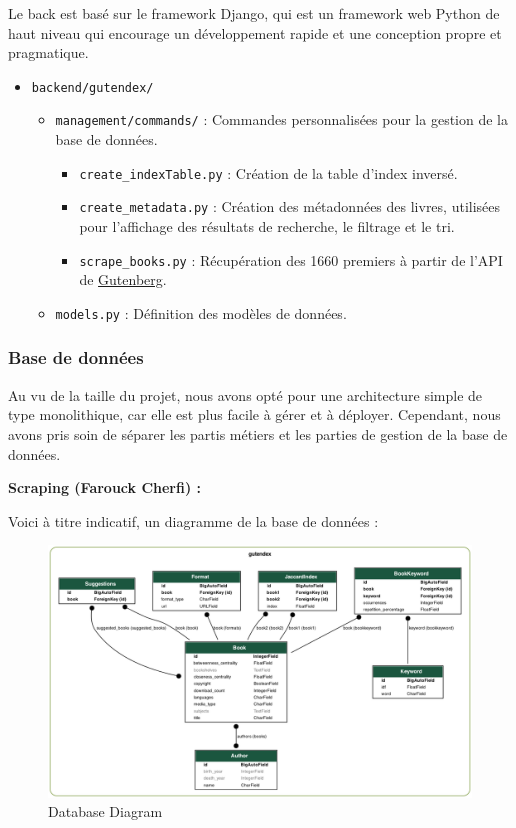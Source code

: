 Le back est basé sur le framework Django, qui est un framework web
Python de haut niveau qui encourage un développement rapide et une
conception propre et pragmatique. \newpage

\begin{itemize}
\tightlist
\item
  \texttt{backend/gutendex/}

  \begin{itemize}
  \tightlist
  \item
    \texttt{management/commands/} : Commandes personnalisées pour la
    gestion de la base de données.

    \begin{itemize}
    \tightlist
    \item
      \texttt{create\_indexTable.py} : Création de la table d'index
      inversé.
    \item
      \texttt{create\_metadata.py} : Création des métadonnées des
      livres, utilisées pour l'affichage des résultats de recherche, le
      filtrage et le tri.
    \item
      \texttt{scrape\_books.py} : Récupération des 1660 premiers à
      partir de l'API de \href{https://www.gutenberg.org/}{Gutenberg}.
    \end{itemize}
  \item
    \texttt{models.py} : Définition des modèles de données.
  \end{itemize}
\end{itemize}

\subsubsection{Base de données}\label{base-de-donnuxe9es}

Au vu de la taille du projet, nous avons opté pour une architecture
simple de type monolithique, car elle est plus facile à gérer et à
déployer. Cependant, nous avons pris soin de séparer les partis métiers
et les parties de gestion de la base de données.

\textbf{Scraping (Farouck Cherfi) : }

\newpage

Voici à titre indicatif, un diagramme de la base de données :

\begin{figure}
\centering
\includegraphics{../backend/db.png}
\caption{Database Diagram}
\end{figure}

